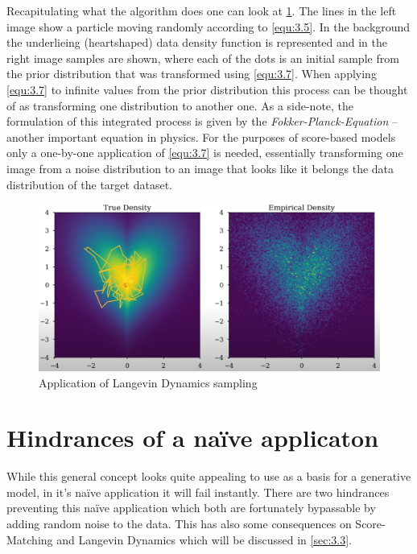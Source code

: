 Recapitulating what the algorithm does one can look at \cref{fig:3.1}. The lines in the left image show a particle moving randomly according to \cref{equ:3.5}. In the background the underlieing (heartshaped) data density function  is represented and in the right image samples are shown, where each of the dots is an initial sample from the prior distribution that was transformed using \cref{equ:3.7}. When applying \cref{equ:3.7} to infinite values from the prior distribution this process can be thought of as transforming one distribution to another one. As a side-note, the formulation of this integrated process is given by the \textit{Fokker-Planck-Equation} – another important equation in physics. For the purposes of score-based models only a one-by-one application of \cref{equ:3.7} is needed, essentially transforming one image from a noise distribution to an image that looks like it belongs the data distribution of the target dataset.
%
\begin{figure}[] \label{fig:3.1}
    \centering
    \includegraphics[width=.8\textwidth]{Chapters/figures/langevin.PNG}
    \caption[Short-form caption]{Application of Langevin Dynamics sampling}
\end{figure}
%
\section{Hindrances of a na\"{i}ve applicaton}
While this general concept looks quite appealing to use as a basis for a generative model, in it's na\"{i}ve application it will fail instantly. There are two hindrances preventing this na\"{i}ve application which both are fortunately bypassable by adding random noise to the data. This has also some consequences on Score-Matching and Langevin Dynamics which will be discussed in \cref{sec:3.3}.
%
